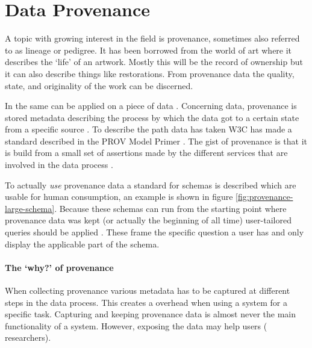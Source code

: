 \newcommand{\agent}{{\tt agent}}
\newcommand{\entity}{{\tt entity}}
\newcommand{\activity}{{\tt activity}}
\newcommand{\relation}{{\tt relation}}
\newcommand{\relations}{{\tt relations}}
\newcommand{\attributes}{{\tt attributes}}

\section{Data Provenance}
\label{datamodel-provenance}

A topic with growing interest in the \escience{} field is provenance, sometimes also referred to as lineage or pedigree.
It has been borrowed from the world of art where it describes the `life' of an artwork.
Mostly this will be the record of ownership but it can also describe things like restorations.
From provenance data the quality, state, and originality of the work can be discerned.

In \escience{} the same can be applied on a piece of data \cite{dsp4moreau}.
Concerning data, provenance is stored metadata describing the process by which the data got to a certain state from a specific source \cite{dsp4moreau,dsp2buneman}.
To describe the path data has taken W3C has made a standard described in the PROV Model Primer \cite{dsp8gil}.
The gist of provenance is that it is build from a small set of assertions made by the different services that are involved in  the data process \cite{dsp4moreau}.

To actually \emph{use} provenance data a standard for schemas is described which are usable for human consumption, an example is shown in figure \ref{fig:provenance-large-schema}.
Because these schemas can run from the starting point where provenance data was kept (or actually the beginning of all time) user-tailored queries should be applied \cite{dsp4moreau}.
These frame the specific question a user has and only display the applicable part of the schema.

\paragraph{The `why?' of provenance}
\label{provenance-why}

When collecting provenance various metadata has to be captured at different steps in the data process.
This creates a overhead when using a system for a specific task.
Capturing and keeping provenance data is almost never the main functionality of a system.
However, exposing the data may help users (\ie{} researchers).

